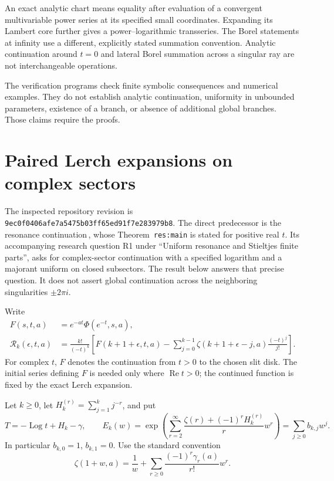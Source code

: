 \documentclass[11pt,a4paper]{article}
\numberwithin{equation}{section}
\theoremstyle{definition}
\theoremstyle{remark}
\begin{document}
An exact analytic chart means equality after evaluation of a convergent
multivariable power series at its specified small coordinates.
Expanding its Lambert core further gives a power--logarithmic
transseries. The Borel statements at infinity use a different,
explicitly stated summation convention. Analytic continuation around
$t=0$ and lateral Borel summation across a singular ray are not
interchangeable operations.

The verification programs check finite symbolic consequences and
numerical examples. They do not establish analytic continuation,
uniformity in unbounded parameters, existence of a branch, or absence
of additional global branches. Those claims require the proofs.


\section{Paired Lerch expansions on complex sectors}
\label{sec:paired}

The inspected repository revision is
\texttt{9ec0f0406afe7a5475b03ff65ed91f7e283979b8}.
The direct predecessor is the resonance continuation\,\cite{repo-resonance},
whose Theorem~\texttt{res:main} is stated for positive real $t$.
Its accompanying research question R1 under
``Uniform resonance and Stieltjes finite parts'', asks for complex-sector
continuation with a specified logarithm and a majorant uniform on closed
subsectors. The result below answers that precise question. It does not
assert global continuation across the neighboring singularities
$\pm2\pi i$.

Write
\begin{align*}
 F(s,t,a)&=e^{-at}\Phi(e^{-t},s,a),\\
 \mathcal R_k(\epsilon,t,a)&=\frac{k!}{(-t)^k}
 \left[F(k+1+\epsilon,t,a)
       -\sum_{j=0}^{k-1}\zeta(k+1+\epsilon-j,a)\frac{(-t)^j}{j!}\right].
\end{align*}
For complex $t$, $F$ denotes the continuation from $t>0$ to the chosen
slit disk. The initial series defining $F$ is needed only where
$\operatorname{Re}t>0$; the continued function is fixed by the exact
Lerch expansion.

Let $k\ge0$, let $H_k^{(r)}=\sum_{j=1}^kj^{-r}$, and put
\[
 T=-\operatorname{Log}t+H_k-\gamma,
 \qquad
 E_k(w)=\exp\left(\sum_{r=2}^{\infty}
        \frac{\zeta(r)+(-1)^rH_k^{(r)}}r w^r\right)
       =\sum_{j\ge0}b_{k,j}w^j.
\]
In particular $b_{k,0}=1$, $b_{k,1}=0$. Use the standard convention
\[
 \zeta(1+w,a)=\frac1w+
       \sum_{r\ge0}\frac{(-1)^r\gamma_r(a)}{r!}w^r.
\]
\end{document}
